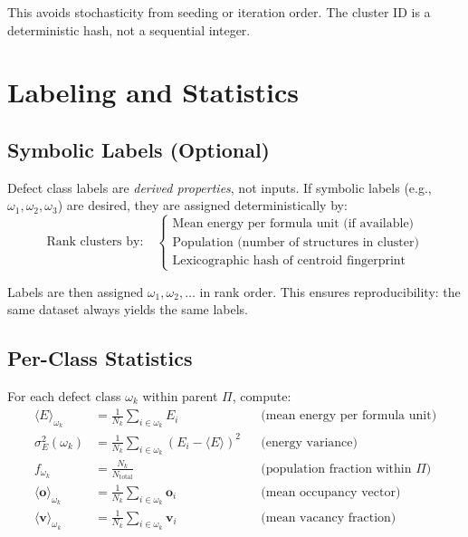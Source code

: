 \documentclass[11pt]{article}
\begin{document}
This avoids stochasticity from seeding or iteration order. The cluster ID is a
deterministic hash, not a sequential integer.

\section{Labeling and Statistics}

\subsection{Symbolic Labels (Optional)}

Defect class labels are \emph{derived properties}, not inputs. If symbolic labels
(e.g., $\omega_1, \omega_2, \omega_3$) are desired, they are assigned
deterministically by:
\begin{equation}
\text{Rank clusters by:} \quad
\begin{cases}
\text{Mean energy per formula unit (if available)} \\
\text{Population (number of structures in cluster)} \\
\text{Lexicographic hash of centroid fingerprint}
\end{cases}
\end{equation}

Labels are then assigned $\omega_1, \omega_2, \ldots$ in rank order. This ensures
reproducibility: the same dataset always yields the same labels.

\subsection{Per-Class Statistics}

For each defect class $\omega_k$ within parent $\Pi$, compute:
\begin{align}
\langle E \rangle_{\omega_k} &= \frac{1}{N_k} \sum_{i \in \omega_k} E_i
  && \text{(mean energy per formula unit)} \\
\sigma_E^2(\omega_k) &= \frac{1}{N_k} \sum_{i \in \omega_k} (E_i - \langle E \rangle)^2
  && \text{(energy variance)} \\
f_{\omega_k} &= \frac{N_k}{N_{\text{total}}}
  && \text{(population fraction within } \Pi \text{)} \\
\langle \mathbf{o} \rangle_{\omega_k} &= \frac{1}{N_k} \sum_{i \in \omega_k} \mathbf{o}_i
  && \text{(mean occupancy vector)} \\
\langle \mathbf{v} \rangle_{\omega_k} &= \frac{1}{N_k} \sum_{i \in \omega_k} \mathbf{v}_i
  && \text{(mean vacancy fraction)}
\end{align}
\end{document}
